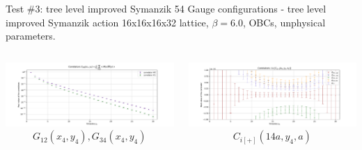 \documentclass{beamer}
\begin{document}
\begin{frame}{Test \#3: tree level improved Symanzik}
      54 Gauge configurations - tree level improved Symanzik action\newline
      16x16x16x32 lattice, $\beta = 6.0$, OBCs, unphysical parameters.
      \begin{columns}
            \begin{column}{.5\textwidth}
                  \includegraphics[width=\textwidth]{../thesis-tex/imgs-MSc-thesis/pureYM-2pts.pdf}
                  $$G_{12}(x_4,y_4), G_{34}(x_4,y_4)$$
            \end{column}
            \begin{column}{.5\textwidth}
                  \includegraphics[width=\textwidth]{../thesis-tex/imgs-MSc-thesis/pureYM-3pts.pdf}
                  $$C_{i[+]}(14a,y_4,a)$$
            \end{column}
      \end{columns}
      \vspace{\baselineskip}
\end{frame}
\end{document}
